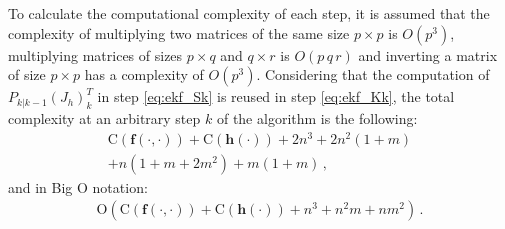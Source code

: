 To calculate the computational complexity of each step, it is assumed that the complexity of multiplying two matrices of the same size $p\times p$ is $O(p^3)$, multiplying matrices of sizes $p\times q$ and $q\times r$ is $O(p\,q\,r)$ and inverting a matrix of size $p\times p$ has a complexity of $O(p^3)$.
Considering that the computation of $P_{k|k-1} (J_h)_k^T$ in step \eqref{eq:ekf_Sk} is reused in step \eqref{eq:ekf_Kk}, the total complexity at an arbitrary step $k$ of the algorithm is the following:
    \begin{align*}
        \text{C}(\mathbf{f}(\cdot, \cdot)) + \text{C}(\mathbf{h}(\cdot)) + 2n^3 + 2n^2(1+m) \\+ n(1+m+2m^2) + m(1+m)\,,
    \end{align*}
and in Big O notation:
    \begin{align}
        \text{O}(\text{C}(\mathbf{f}(\cdot, \cdot)) + \text{C}(\mathbf{h}(\cdot)) + n^3 + n^2m + nm^2)\,.
    \end{align}
